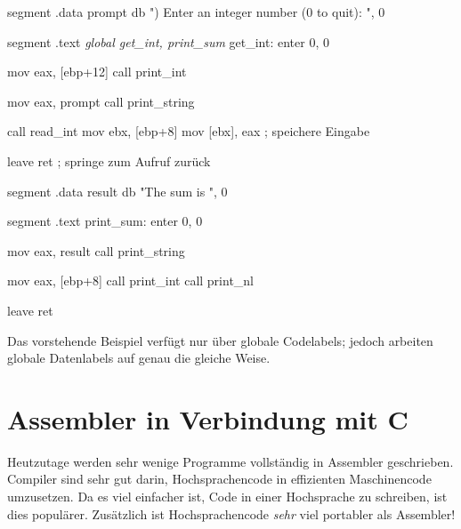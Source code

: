 \begin{AsmCodeListing}[label=sub4.asm, numbers=left, commandchars=\\\{\}]

 segment .data
 prompt  db      ") Enter an integer number (0 to quit): ", 0

 segment .text
\textit{         global  get_int, print_sum}
 get_int:
         enter   0, 0

         mov     eax, [ebp+12]
         call    print_int

         mov     eax, prompt
         call    print_string

         call    read_int
         mov     ebx, [ebp+8]
         mov     [ebx], eax         ; speichere Eingabe

         leave
         ret                        ; springe zum Aufruf zur\"{u}ck

 segment .data
 result  db      "The sum is ", 0

 segment .text
 print_sum:
         enter   0, 0

         mov     eax, result
         call    print_string

         mov     eax, [ebp+8]
         call    print_int
         call    print_nl

         leave
         ret
\end{AsmCodeListing}

Das vorstehende Beispiel verf\"{u}gt nur \"{u}ber globale
 Codelabels; jedoch arbeiten globale
Datenlabels auf genau die gleiche Weise. 

\section{Assembler in Verbindung mit C}

Heutzutage werden sehr wenige Programme vollst\"{a}ndig in Assembler
geschrieben. Compiler sind sehr gut darin, Hochsprachencode in
effizienten Maschinencode umzusetzen. Da es viel einfacher ist, Code
in einer Hochsprache zu schreiben, ist dies popul\"{a}rer. Zus\"{a}tzlich
ist Hochsprachencode \emph{sehr} viel portabler als Assembler!


